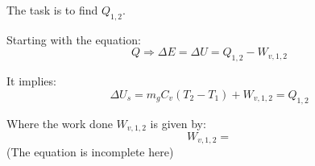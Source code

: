 The task is to find \( Q_{1,2} \).

Starting with the equation:
\[ Q \Rightarrow \Delta E = \Delta U = Q_{1,2} - W_{v,1,2} \]

It implies:
\[ \Delta U_s = m_g C_v (T_2 - T_1) + W_{v,1,2} = Q_{1,2} \]

Where the work done \( W_{v,1,2} \) is given by:
\[ W_{v,1,2} = \] (The equation is incomplete here)